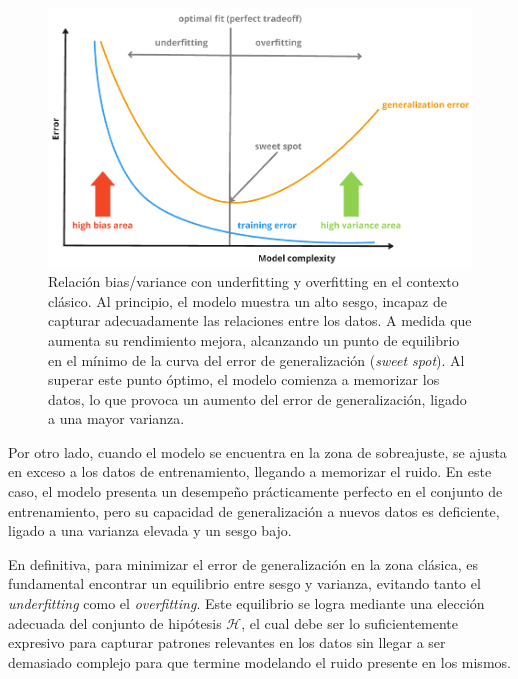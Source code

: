 \begin{figure}[h]
    \centering
    \includegraphics[width=0.6\linewidth]{img/biasvarianceunderoverfitting.png}
    \caption[Relación bias/variance con underfitting y overfitting en el contexto clásico.] {Relación bias/variance con underfitting y overfitting en el contexto clásico. Al principio, el modelo muestra un alto sesgo, incapaz de capturar adecuadamente las relaciones entre los datos. A medida que aumenta su rendimiento mejora, alcanzando un punto de equilibrio en el mínimo de la curva del error de generalización (\textit{sweet spot}). Al superar este punto óptimo, el modelo comienza a memorizar los datos, lo que provoca un aumento del error de generalización, ligado a una mayor varianza.}\label{fig:biasvarianceunderoverfitting}
\end{figure}

Por otro lado, cuando el modelo se encuentra en la zona de sobreajuste, se ajusta en exceso a los datos de entrenamiento, llegando a memorizar el ruido. En este caso, el modelo presenta un desempeño prácticamente perfecto en el conjunto de entrenamiento, pero su capacidad de generalización a nuevos datos es deficiente, ligado a una varianza elevada y un sesgo bajo.\newline

En definitiva, para minimizar el error de generalización en la zona clásica, es fundamental encontrar un equilibrio entre sesgo y varianza, evitando tanto el \emph{underfitting} como el \emph{overfitting}. Este equilibrio se logra mediante una elección adecuada del conjunto de hipótesis $\mathcal{H}$, el cual debe ser lo suficientemente expresivo para capturar patrones relevantes en los datos sin llegar a ser demasiado complejo para que termine modelando el ruido presente en los mismos.

\endinput
